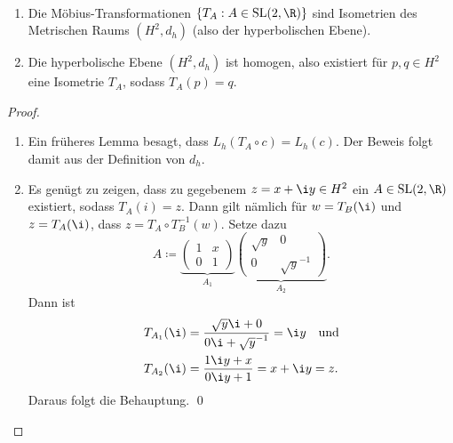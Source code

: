 \begin{theorem}
  \
  \begin{enumerate}
    \item Die Möbius-Transformationen \( \left \{ T_A : A \in \text{SL}(2,\R) \right \} \) sind Isometrien des Metrischen Raums \( (H^2, d_h) \) (also der hyperbolischen Ebene).
    \item Die hyperbolische Ebene \( (H^2, d_h) \) ist homogen, also existiert für \( p,q \in H^2 \) eine Isometrie \( T_A \), sodass \( T_A(p) = q \).
  \end{enumerate}

  \begin{proof}
    \
    \begin{enumerate}
      \item Ein früheres Lemma besagt, dass \( L_h(T_A \circ c) = L_h(c) \). Der Beweis folgt damit aus der Definition von \( d_h \).

      \item Es genügt zu zeigen, dass zu gegebenem \( z = x + \i y \in H^2 \) ein \( A \in \text{SL}(2,\R) \) existiert, sodass \( T_A(i) = z \). Dann gilt nämlich für \( w = T_B(\i) \) und \( z = T_A(\i) \), dass \( z = T_A \circ T_B^{-1}(w) \). Setze dazu
      \begin{equation*}
        A \coloneqq \underbrace{\begin{pmatrix}
          1 & x \\ 0 & 1
        \end{pmatrix}}_{A_1}\underbrace{\begin{pmatrix}
          \sqrt{y} & 0 \\ 0 & \sqrt{y}^{-1}
        \end{pmatrix}}_{A_2}\text{.}
      \end{equation*}
      Dann ist
      \begin{align*}
        T_{A_1}(\i) &= \frac{\sqrt{y}\i + 0}{0\i + \sqrt{y}^{-1}} = \i y \quad \text{und} \\
        T_{A_2}(\i) &= \frac{1\i y + x}{0\i y + 1} = x + \i y = z\text{.}
      \end{align*}
      Daraus folgt die Behauptung. \qed
    \end{enumerate}
  \end{proof}
\end{theorem}

